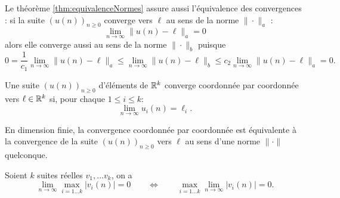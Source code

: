 
\remark
Le théorème \ref{thm:equivalenceNormes} assure aussi l'équivalence des convergences : si la suite $(u(n))_{n \geq 0}$ converge vers $\ell$ au sens de la norme $\|\cdot\|_a$ :
$$
\lim_{n \to \infty} \|u(n) - \ell\|_a = 0
$$
alors elle converge aussi au sens de la norme $\|\cdot\|_b$ puisque
$$
0 = \frac1{c_1} \lim_{n \to \infty} \|u(n) - \ell\|_a
\leq \lim_{n \to \infty} \|u(n) - \ell\|_b \leq
c_2 \lim_{n \to \infty} \|u(n) - \ell\|_a = 0.
$$

\begin{definition}
  Une suite $(u(n))_{n \geq 0}$ d'éléments de $\mathbb{R}^k$ converge coordonnée par coordonnée vers $\ell \in \mathbb{R}^k$ si, pour chaque $1 \leq i \leq k$:
  $$
  \lim_{n \to \infty} u_i(n) = \ell_i.
  $$
\end{definition}

\begin{proposition} \label{prop:convergenceParCoordonnee}
  En dimension finie, la convergence coordonnée par coordonnée est équivalente à la convergence de la suite $(u(n))_{n \geq 0}$ vers $\ell$ au sens d'une norme $\|\cdot\|$ quelconque.
\end{proposition}

\begin{lemma} \label{lem:inversionLimiteMaximum}
  Soient $k$ suites réelles $v_1, \dots v_k$, on a
  $$
  \lim_{n \to \infty} \max_{i=1 \dots k} |v_i(n)| = 0
  \qquad \Leftrightarrow \qquad
  \max_{i=1 \dots k} \lim_{n \to \infty} |v_i(n)| = 0.
  $$
\end{lemma}

